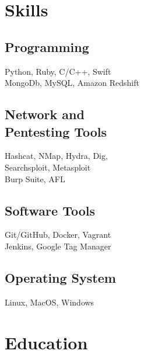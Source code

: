 \documentclass[letterpaper]{deedy-resume} %
\begin{document}
\begin{minipage}[t]{0.30\textwidth} %


\section{Skills}

\subsection{Programming}
Python, Ruby, C/C++, Swift \\
MongoDb, MySQL, Amazon Redshift \\

\sectionspace %

\subsection{Network and \\ Pentesting Tools}
Hashcat, NMap, Hydra, Dig, \\
Searchsploit, Metasploit \\
Burp Suite, AFL \\

\sectionspace %

\subsection{Software Tools}
Git/GitHub, Docker, Vagrant \\
Jenkins, Google Tag Manager \\

\sectionspace %

\subsection{Operating System}
Linux, MacOS, Windows \\

\sectionspace %


\section{Education} 


\end{minipage}
\end{document}
